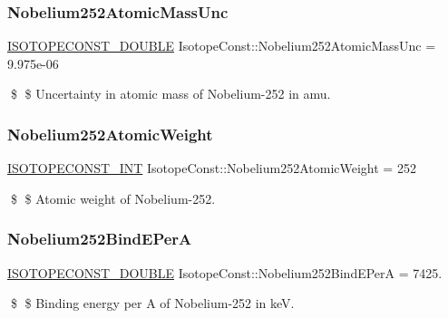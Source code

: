 \subsubsection{\texorpdfstring{Nobelium252\+Atomic\+Mass\+Unc}{Nobelium252AtomicMassUnc}}
{\footnotesize\ttfamily \mbox{\hyperlink{group___isotope_const-_macros_ga8f45a7272ce02c0b4c65c44636ed719a}{I\+S\+O\+T\+O\+P\+E\+C\+O\+N\+S\+T\+\_\+\+D\+O\+U\+B\+LE}} Isotope\+Const\+::\+Nobelium252\+Atomic\+Mass\+Unc = 9.\+975e-\/06}

\$ \$ Uncertainty in atomic mass of Nobelium-\/252 in amu. \mbox{\label{group___isotope_const-_nobelium-_no252_ga7da0989004a0314dbf00461a2c1776a2}} 
\subsubsection{\texorpdfstring{Nobelium252\+Atomic\+Weight}{Nobelium252AtomicWeight}}
{\footnotesize\ttfamily \mbox{\hyperlink{group___isotope_const-_macros_ga5f18360b3e99483a35c32d789e62621c}{I\+S\+O\+T\+O\+P\+E\+C\+O\+N\+S\+T\+\_\+\+I\+NT}} Isotope\+Const\+::\+Nobelium252\+Atomic\+Weight = 252}

\$ \$ Atomic weight of Nobelium-\/252. \mbox{\label{group___isotope_const-_nobelium-_no252_gafdc6108f1c5939e09467accf836c3759}} 
\subsubsection{\texorpdfstring{Nobelium252\+Bind\+E\+PerA}{Nobelium252BindEPerA}}
{\footnotesize\ttfamily \mbox{\hyperlink{group___isotope_const-_macros_ga8f45a7272ce02c0b4c65c44636ed719a}{I\+S\+O\+T\+O\+P\+E\+C\+O\+N\+S\+T\+\_\+\+D\+O\+U\+B\+LE}} Isotope\+Const\+::\+Nobelium252\+Bind\+E\+PerA = 7425.}

\$ \$ Binding energy per A of Nobelium-\/252 in keV. \mbox{\label{group___isotope_const-_nobelium-_no252_ga08a5d790973b105d6891b772dd71ed05}} 
